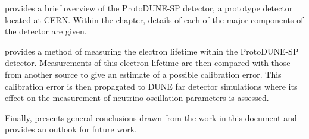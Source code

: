  provides a brief overview of the ProtoDUNE-SP detector, a prototype detector located at CERN.
Within the chapter, details of each of the major components of the detector are given.

 provides a method of measuring the electron lifetime within the ProtoDUNE-SP detector.
Measurements of this electron lifetime are then compared with those from another source to give an estimate of a possible calibration error.
This calibration error is then propagated to DUNE far detector simulations where its effect on the measurement of neutrino oscillation parameters is assessed.

Finally,  presents general conclusions drawn from the work in this document and provides an outlook for future work.
